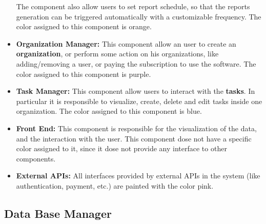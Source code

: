 \documentclass{article}
\begin{document}
\begin{itemize}
          The component also allow users to set report schedule, so that the reports generation can be triggered automatically with a customizable frequency.
          The color assigned to this component is \textcolor[HTML]{FA9646}{orange}.
    \item \textcolor[HTML]{FF00FF}{\textbf{Organization Manager: }} This component allow an user to create an \textbf{organization}, or perform some action on his organizations,
          like adding/removing a user, or paying the subscription to use the software. The color assigned to this component is \textcolor[HTML]{FF00FF}{purple}.
    \item \textcolor[HTML]{2682D5}{\textbf{Task Manager: }} This component allow users to interact with the \textbf{tasks}.
          In particular it is responsible to visualize, create, delete and edit tasks inside one organization. The color assigned to this component is \textcolor[HTML]{2682D5}{blue}.
    \item \textbf{Front End: } This component is responsible for the visualization of the data, and the interaction with the user. This component dose not have a specific color assigned to it, since it dose not provide any interface to other components.
    \item \textcolor[HTML]{E68CB4}{\textbf{External APIs: }} All interfaces provided by external APIs in the system (like authentication, payment, etc.) are painted with the color \textcolor[HTML]{E68CB4}{pink}.
\end{itemize}

\subsection{Data Base Manager}
\end{document}
